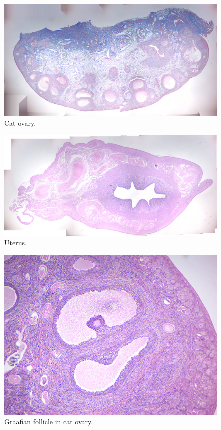 \begin{figure}

{\centering \includegraphics[width=0.7\linewidth]{./figures/development/cat_ovary}

}

\caption{Cat ovary.}\label{fig:ovary}
\end{figure}

\begin{figure}

{\centering \includegraphics[width=0.7\linewidth]{./figures/development/uterus}

}

\caption{Uterus.}\label{fig:uterus}
\end{figure}

\begin{figure}

{\centering \includegraphics[width=0.7\linewidth]{./figures/development/graafian_follicle}

}

\caption{Graafian follicle in cat ovary.}\label{fig:graafian}
\end{figure}

